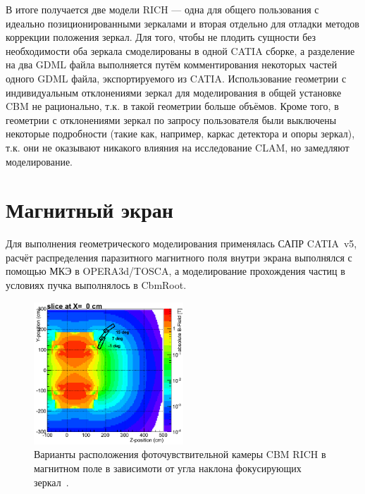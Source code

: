 В итоге получается две модели RICH --- одна для общего пользования с идеально позиционированными зеркалами и вторая отдельно для отладки методов коррекции положения зеркал. Для того, чтобы не \todo плодить сущности без необходимости оба зеркала смоделированы в одной CATIA сборке, а разделение на два GDML файла выполняется путём комментирования некоторых частей одного GDML файла, экспортируемого из CATIA. Использование геометрии с индивидуальным отклонениями зеркал для моделирования в общей установке CBM не рационально, т.к. в такой геометрии больше объёмов. Кроме того, в геометрии с отклонениями зеркал по запросу пользователя были выключены некоторые подробности (такие как, например, каркас детектора и опоры зеркал), т.к. они не оказывают никакого влияния на исследование CLAM, но замедляют моделирование.


\section{Магнитный экран}\label{sec:secRICHmagScreen}

Для выполнения геометрического моделирования применялась САПР CATIA~v5, расчёт распределения паразитного магнитного поля внутри экрана выполнялся с помощью МКЭ в OPERA3d/TOSCA, а моделирование прохождения частиц в условиях пучка выполнялось в CbmRoot.

\begin{figure}[H]
\centering
\includegraphics[width=0.5\textwidth]{pictures/MagScreenPositions.png}
\caption{Варианты расположения фоточувствительной камеры CBM RICH в магнитном поле в зависимоти от угла наклона фокусирующих зеркал~\cite{}.}
\label{fig:MagScreenPositions}
\end{figure}

